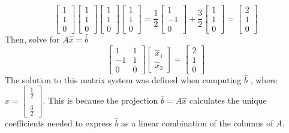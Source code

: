 \begin{enumerate}
\[{    \begin{bmatrix} 1 \\ 1 \\ 0 \end{bmatrix}}{\begin{bmatrix} 1 \\ 1 
  \\ 0 \end{bmatrix} \begin{bmatrix} 1 \\ 1 \\ 0 \end{bmatrix}} \begin{bmatrix} 1 \\ 1 \\ 0 \end{bmatrix} = \frac{1}{2} \begin{bmatrix}
  1 \\ -1 \\ 0 \end{bmatrix} + \frac{3}{2} \begin{bmatrix} 1 \\ 1 \\ 0 
  \end{bmatrix} = \begin{bmatrix} 2 \\ 1 \\ 0 \end{bmatrix}
\]
Then, solve for $A\hat{x} = \hat{b}$ 
\[
  \begin{bmatrix} 1 & 1 \\ -1 & 1 \\ 0 & 0 \end{bmatrix}
\begin{bmatrix} \hat{x}_1 \\ \hat{x}_2 \end{bmatrix}
  = \begin{bmatrix} 2 \\ 1 \\ 0 \end{bmatrix}
\]
The solution to this matrix system was defined when computing $\hat{b}$ 
, where $\hat{x} = \begin{bmatrix} \frac{1}{2} \\\\ \frac{3}{2} 
\end{bmatrix}$. This is because the projection $\hat{b} = A \hat{x}$ 
calculates the unique coefficients needed to express $\hat{b}$ as 
a linear combination of the columns of $A$. \\\\

\end{enumerate}
